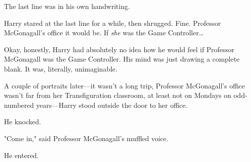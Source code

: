 The last line was in his own handwriting.

Harry stared at the last line for a while, then shrugged. Fine. Professor 
McGonagall's office it would be. If \emph{she} was the Game Controller{\ldots}

Okay, honestly, Harry had absolutely no idea how he would feel if Professor 
McGonagall was the Game Controller. His mind was just drawing a complete blank. 
It was, literally, unimaginable.

A couple of portraits later---it wasn't a long trip, Professor McGonagall's 
office wasn't far from her Transfiguration classroom, at least not on Mondays 
on odd-numbered years---Harry stood outside the door to her office.

He knocked.

"Come in," said Professor McGonagall's muffled voice.

He entered.

